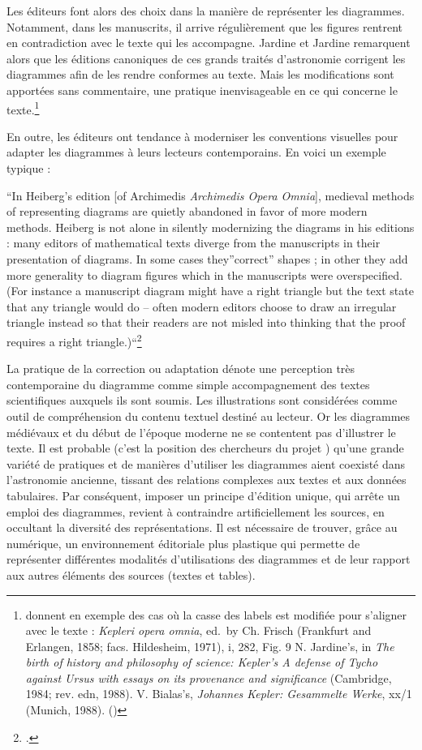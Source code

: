 Les éditeurs font alors des choix dans la manière de représenter les
diagrammes. Notamment, dans les manuscrits, il arrive régulièrement que
les figures rentrent en contradiction avec le texte qui les accompagne.
Jardine et Jardine remarquent alors que les éditions canoniques de ces
grands traités d'astronomie corrigent les diagrammes afin de les rendre
conformes au texte. Mais les modifications sont apportées sans
commentaire, une pratique inenvisageable en ce qui concerne le
texte.\footnote{\citeauthor{jardine_critical_2010} donnent
  en exemple des cas où la casse des labels est modifiée pour s'aligner
  avec le texte : \emph{Kepleri opera omnia}, ed.~by Ch. Frisch
  (Frankfurt and Erlangen, 1858; facs. Hildesheim, 1971), i, 282, Fig. 9
  N. Jardine's, in \emph{The birth of history and philosophy of science:
  Kepler's A defense of Tycho against Ursus with essays on its
  provenance and significance} (Cambridge, 1984; rev. edn, 1988). V.
  Bialas's, \emph{Johannes Kepler: Gesammelte Werke}, xx/1 (Munich,
  1988). (\cite[p.411]{jardine_critical_2010})}

En outre, les éditeurs ont tendance à moderniser les conventions
visuelles pour adapter les diagrammes à leurs lecteurs contemporains. En
voici un exemple typique :

\begin{kwote}
``In Heiberg's edition {[}of Archimedis \emph{Archimedis Opera
Omnia}{]}, medieval methods of representing diagrams are quietly
abandoned in favor of more modern methods. Heiberg is not alone in
silently modernizing the diagrams in his editions : many editors of
mathematical texts diverge from the manuscripts in their presentation of
diagrams. In some cases they''correct'' shapes ; in other they add more
generality to diagram figures which in the manuscripts were
overspecified. (For instance a manuscript diagram might have a right
triangle but the text state that any triangle would do -- often modern
editors choose to draw an irregular triangle instead so that their
readers are not misled into thinking that the proof requires a right
triangle.)``\footcite[p.78]{roughan_digital_2014}
\end{kwote}

La pratique de la correction ou adaptation dénote une perception très
contemporaine du diagramme comme simple accompagnement des textes
scientifiques auxquels ils sont soumis. Les illustrations sont
considérées comme outil de compréhension du contenu textuel destiné au
lecteur. Or les diagrammes médiévaux et du début de l'époque moderne ne
se contentent pas d'illustrer le texte. Il est probable (c'est la position des chercheurs du projet \eida) qu'une grande variété de pratiques et de manières d'utiliser les diagrammes aient coexisté dans l'astronomie ancienne, tissant des relations complexes aux textes et aux données tabulaires. Par conséquent, imposer un principe d'édition unique, qui arrête un emploi des diagrammes, revient à contraindre artificiellement les sources, en occultant la diversité des représentations. Il est nécessaire de trouver, grâce au numérique, un environnement éditoriale plus plastique qui permette de représenter différentes modalités d'utilisations des diagrammes et de leur rapport aux autres éléments des sources (textes et tables).

